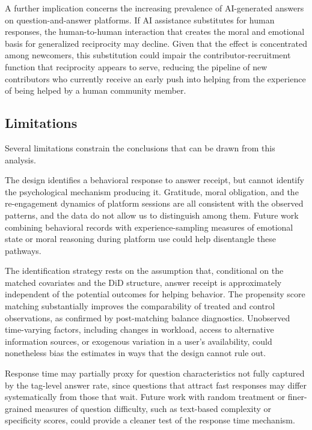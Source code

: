 A further implication concerns the increasing prevalence of AI-generated answers on question-and-answer platforms. If AI assistance substitutes for human responses, the human-to-human interaction that creates the moral and emotional basis for generalized reciprocity may decline. Given that the effect is concentrated among newcomers, this substitution could impair the contributor-recruitment function that reciprocity appears to serve, reducing the pipeline of new contributors who currently receive an early push into helping from the experience of being helped by a human community member.

\subsection{Limitations}

Several limitations constrain the conclusions that can be drawn from this analysis.

The design identifies a behavioral response to answer receipt, but cannot identify the psychological mechanism producing it. Gratitude, moral obligation, and the re-engagement dynamics of platform sessions are all consistent with the observed patterns, and the data do not allow us to distinguish among them. Future work combining behavioral records with experience-sampling measures of emotional state or moral reasoning during platform use could help disentangle these pathways.

The identification strategy rests on the assumption that, conditional on the matched covariates and the DiD structure, answer receipt is approximately independent of the potential outcomes for helping behavior. The propensity score matching substantially improves the comparability of treated and control observations, as confirmed by post-matching balance diagnostics. Unobserved time-varying factors, including changes in workload, access to alternative information sources, or exogenous variation in a user's availability, could nonetheless bias the estimates in ways that the design cannot rule out.

Response time may partially proxy for question characteristics not fully captured by the tag-level answer rate, since questions that attract fast responses may differ systematically from those that wait. Future work with random treatment or finer-grained measures of question difficulty, such as text-based complexity or specificity scores, could provide a cleaner test of the response time mechanism.

